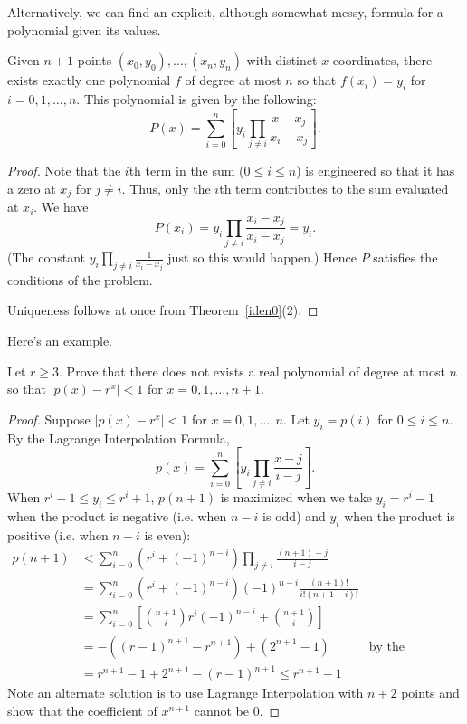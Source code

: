 Alternatively, we can find an explicit, although somewhat messy, formula for a polynomial given its values.
\begin{thm} Given $n+1$ points $(x_0,y_0),\ldots, (x_n,y_n)$ with distinct $x$-coordinates, there exists exactly one polynomial $f$ of degree at most $n$ so that $f(x_i)=y_i$ for $i=0,1,\ldots, n$. This polynomial is given by the following:
\[ P(x)=\sum_{i=0}^{n} \left[ y_i \prod_{j\neq i} \frac{x-x_j}{x_i-x_j} \right].\]
\end{thm}
\begin{proof}
Note that the $i$th term in the sum ($0\leq i\leq n$) is engineered so that it has a zero at $x_j$ for $j\neq i$. Thus, only the $i$th term contributes to the sum evaluated at $x_i$. We have
\[P(x_i)=y_i \prod_{j\neq i} \frac{x_i-x_j}{x_i-x_j}=y_i.\]
(The constant $y_i\prod_{j\neq i} \frac{1}{x_i-x_j}$ just so this would happen.) Hence $P$ satisfies the conditions of the problem.

Uniqueness follows at once from Theorem~\ref{iden0}(2).
\end{proof}
Here's an example.
\begin{ex}
Let $r\geq 3$. Prove that there does not exists a real polynomial of degree at most $n$ so that $|p(x)-r^x|< 1$ for $x=0,1,\ldots, n+1$.
\end{ex}
\begin{proof}
Suppose $|p(x)-r^x|< 1$ for $x=0,1,\ldots, n$. Let $y_i=p(i)$ for $0\leq i\leq n$. By the Lagrange Interpolation Formula,
\[p(x)=\sum_{i=0}^{n} \left[ y_i \prod_{j\neq i} \frac{x-j}{i-j} \right].\]
When $r^i-1\leq y_i\leq r^i+1$, $p(n+1)$ is maximized when we take $y_i=r^i-1$ when the product is negative (i.e. when $n-i$ is odd) and $y_i$ when the product is positive (i.e. when $n-i$ is even):
\begin{align*}p(n+1)&< \sum_{i=0}^{n} (r^i+(-1)^{n-i}) \prod_{j\neq i} \frac{(n+1)-j}{i-j} \\
&=\sum_{i=0}^n (r^i+(-1)^{n-i}) (-1)^{n-i}\frac{(n+1)!}{i!(n+1-i)!} \\
&=\sum_{i=0}^n \left[\binom{n+1}{i}r^i(-1)^{n-i} +\binom{n+1}{i}\right] \\
&=-((r-1)^{n+1}-r^{n+1})+(2^{n+1}-1)&\text{by the Binomial Theorem}\\
&=r^{n+1}-1+2^{n+1}-(r-1)^{n+1}\leq r^{n +1}-1
\end{align*}
Note an alternate solution is to use Lagrange Interpolation with $n+2$ points and show that the coefficient of $x^{n+1}$ cannot be 0.
\end{proof}

